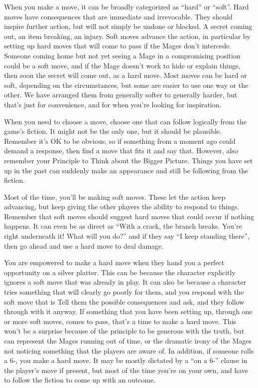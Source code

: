 \documentclass[
  oneside,
  statementpaper,
  9pt]{memoir}
\begin{document}
When you make a move, it can be broadly categorized as ``hard'' or
``soft''. Hard moves have consequences that are immediate and
irrevocable. They should inspire further action, but will not simply be
undone or blocked. A secret coming out, an item breaking, an injury.
Soft moves advance the action, in particular by setting up hard moves
that will come to pass if the Mages don't intercede. Someone coming home
but not yet seeing a Mage in a compromising position could be a soft
move, and if the Mage doesn't work to hide or explain things, then soon
the secret will come out, as a hard move. Most moves can be hard or
soft, depending on the circumstances, but some are easier to use one way
or the other. We have arranged them from generally softer to generally
harder, but that's just for convenience, and for when you're looking for
inspiration.

When you need to choose a move, choose one that can follow logically
from the game's fiction. It might not be the only one, but it should be
plausible. Remember it's OK to be obvious, so if something from a moment
ago could demand a response, then find a move that fits it and say that.
However, also remember your Principle to Think about the Bigger Picture.
Things you have set up in the past can suddenly make an appearance and
still be following from the fiction.

Most of the time, you'll be making soft moves. These let the action keep
advancing, but keep giving the other players the ability to respond to
things. Remember that soft moves should suggest hard moves that could
occur if nothing happens. It can even be as direct as ``With a crack,
the branch breaks. You're right underneath it! What will you do?'' and
if they say ``I keep standing there'', then go ahead and use a hard move
to deal damage.

You are empowered to make a hard move when they hand you a perfect
opportunity on a silver platter. This can be because the character
explicitly ignores a soft move that was already in play. It can also be
because a character tries something that will clearly go poorly for
them, and you respond with the soft move that is Tell them the possible
consequences and ask, and they follow through with it anyway. If
something that you have been setting up, through one or more soft moves,
comes to pass, that's a time to make a hard move. This won't be a
surprise because of the principle to be generous with the truth, but can
represent the Mages running out of time, or the dramatic irony of the
Mages not noticing something that the players are aware of. In addition,
if someone rolls a 6-, you make a hard move. It may be mostly dictated
by a ``on a 6-'' clause in the player's move if present, but most of the
time you're on your own, and have to follow the fiction to come up with
an outcome.
\end{document}

